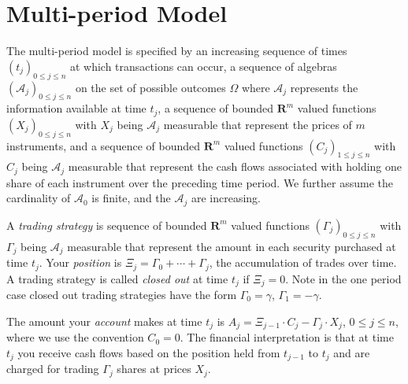 \documentclass[fleqn]{amsart}
\newcommand{\R}{\mathbf{R}}
\renewcommand{\AA}{\mathcal{A}}
\providecommand{\norm}[1]{\lVert#1\rVert}
\begin{document}


\section{Multi-period Model}
The multi-period model is specified by an increasing sequence of times
$(t_j)_{0\le j\le n}$ at which transactions can occur, a sequence
of algebras $(\AA_j)_{0\le j\le n}$ on the set of possible outcomes
$\Omega$ where $\AA_j$ represents the information available at time
$t_j$, a sequence of bounded $\R^m$ valued functions $(X_j)_{0\le
j\le n}$ with $X_j$ being $\AA_j$ measurable that represent the prices
of $m$ instruments, and a sequence of bounded $\R^m$ valued functions
$(C_j)_{1\le j\le n}$ with $C_j$ being $\AA_j$ measurable that represent
the cash flows associated with holding one share of each instrument over
the preceding time period. We further assume the cardinality of $\AA_0$
is finite, and the $\AA_j$ are increasing.

A {\em trading strategy} is sequence of bounded $\R^m$ valued functions
$(\Gamma_j)_{0\le j\le n}$ with $\Gamma_j$ being $\AA_j$ measurable
that represent the amount in each security purchased at time $t_j$.
Your {\em position} is $\Xi_j = \Gamma_0 + \cdots + \Gamma_j$, the
accumulation of trades over time. A trading strategy is
called {\em closed out} at time $t_j$ if $\Xi_j = 0$. Note in the one period case closed out trading strategies have the
form $\Gamma_0 = \gamma$, $\Gamma_1 = -\gamma$.

The amount your {\em account} makes at time \(t_j\) is
\(A_j = \Xi_{j-1}\cdot C_j - \Gamma_j\cdot X_j\), \(0\le j\le n\),
where we use the convention \(C_0 = 0\). The financial interpretation
is that at time \(t_j\) you receive cash flows based on the position
held from \(t_{j-1}\) to \(t_j\) and are charged for trading 
\(\Gamma_j\) shares at prices \(X_j\).
\end{document}
